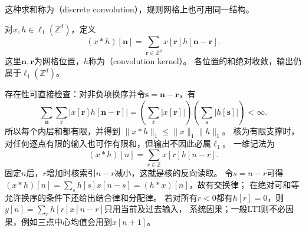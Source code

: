 这种求和称为（discrete convolution），规则网格上也可用同一结构。
\begin{definition}[网格上的离散卷积]
  \label{def:signal-analysis-discrete-convolution}
  对$x,h\in\ell_1(\mathbb Z^d)$，定义
  \begin{equation}
    (x*h)[\bm n]=\sum_{\bm r\in\mathbb Z^d}x[\bm r]h[\bm n-\bm r].
    \label{eq:signal-analysis-discrete-multidimensional-convolution}
  \end{equation}
  这里$\bm n,\bm r$为网格位置，$h$称为（convolution kernel）。
  各位置的和绝对收敛，输出仍属于$\ell_1(\mathbb Z^d)$。
\end{definition}
存在性可直接检查：对非负项换序并令$\bm s=\bm n-\bm r$，有
\[
  \sum_{\bm n}\sum_{\bm r}|x[\bm r]h[\bm n-\bm r]|
  =\left(\sum_{\bm r}|x[\bm r]|\right)
   \left(\sum_{\bm s}|h[\bm s]|\right)<\infty.
\]
所以每个内层和都有限，并得到
$\|x*h\|_1\leq\|x\|_1\|h\|_1$。
核为有限支撑时，对任何逐点有限的输入也可作有限和，但输出不因此必属$\ell_1$。
一维记法为
\begin{equation}
  (x*h)[n]=\sum_{r\in\mathbb Z}x[r]h[n-r].
  \label{eq:signal-analysis-linear-convolution}
\end{equation}
固定$n$后，$r$增加时核索引$n-r$减小，这就是核的反向读取。
令$s=n-r$可得$(x*h)[n]=\sum_s h[s]x[n-s]=(h*x)[n]$，故有交换律；
在绝对可和等允许换序的条件下还给出结合律和分配律。
若对所有$r<0$都有$h[r]=0$，则$y[n]=\sum_r h[r]x[n-r]$只用当前及过去输入，
系统因果；一般LTI则不必因果，例如三点中心均值会用到$x[n+1]$。

